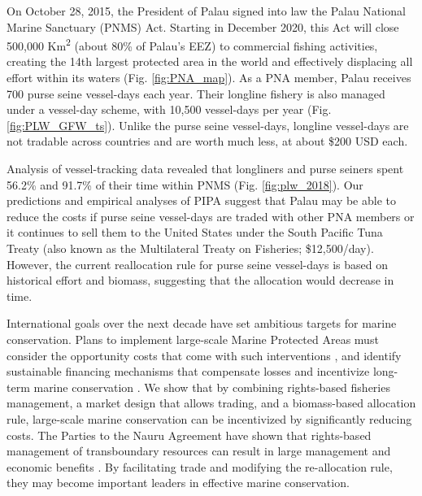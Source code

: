 \documentclass[12pt]{article}
\begin{document}
On October 28, 2015, the President of Palau signed into law the Palau National Marine Sanctuary (PNMS) Act. Starting in December 2020, this Act will close 500,000 Km\textsuperscript{2} (about 80\% of Palau’s EEZ) to commercial fishing activities, creating the 14th largest protected area in the world and effectively displacing all effort within its waters (Fig. \ref{fig:PNA_map}). As a PNA member, Palau receives 700 purse seine vessel-days each year. Their longline fishery is also managed under a vessel-day scheme, with 10,500 vessel-days per year (Fig. \ref{fig:PLW_GFW_ts}). Unlike the purse seine vessel-days, longline vessel-days are not tradable across countries and are worth much less, at about \$200 USD each.

Analysis of vessel-tracking data revealed that longliners and purse seiners spent 56.2\% and 91.7\% of their time within PNMS (Fig. \ref{fig:plw_2018}). Our predictions and empirical analyses of PIPA suggest that Palau may be able to reduce the costs if purse seine vessel-days are traded with other PNA members or it continues to sell them to the United States under the South Pacific Tuna Treaty (also known as the Multilateral Treaty on Fisheries; \$12,500/day). However, the current reallocation rule for purse seine vessel-days is based on historical effort and biomass, suggesting that the allocation would decrease in time.

International goals over the next decade have set ambitious targets for marine conservation. Plans to implement large-scale Marine Protected Areas must consider the opportunity costs that come with such interventions \cite{smith_2010}, and identify sustainable financing mechanisms that compensate losses and incentivize long-term marine conservation \cite{mallin_2019}. We show that by combining rights-based fisheries management, a market design that allows trading, and a biomass-based allocation rule, large-scale marine conservation can be incentivized by significantly reducing costs. The Parties to the Nauru Agreement have shown that rights-based management of transboundary resources can result in large management and economic benefits \cite{havice_2013,aqorau_2018}. By facilitating trade and modifying the re-allocation rule, they may become important leaders in effective marine conservation.





\clearpage

\FloatBarrier
\end{document}

